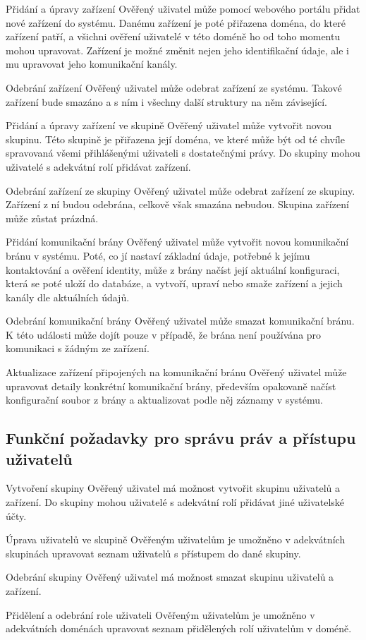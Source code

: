 \begin{enumfunctional}[style=nextline]
\item[Přidání a úpravy zařízení]
Ověřený uživatel může pomocí webového portálu přidat nové zařízení do systému. Danému zařízení je poté přiřazena doména, do které zařízení patří, a všichni ověření uživatelé v této doméně ho od toho momentu mohou upravovat. Zařízení je možné změnit nejen jeho identifikační údaje, ale i mu upravovat jeho komunikační kanály.
\item[Odebrání zařízení]
Ověřený uživatel může odebrat zařízení ze systému. Takové zařízení bude smazáno a s ním i všechny další struktury na něm závisející.
\item[Přidání a úpravy zařízení ve skupině]
Ověřený uživatel může vytvořit novou skupinu. Této skupině je přiřazena její doména, ve které může být od té chvíle spravovaná všemi přihlášenými uživateli s dostatečnými právy. Do skupiny mohou uživatelé s adekvátní rolí přidávat zařízení.
\item[Odebrání zařízení ze skupiny]
Ověřený uživatel může odebrat zařízení ze skupiny. Zařízení z ní budou odebrána, celkově však smazána nebudou. Skupina zařízení může zůstat prázdná.
\item[Přidání komunikační brány]
Ověřený uživatel může vytvořit novou komunikační bránu v systému. Poté, co jí nastaví základní údaje, potřebné k jejímu kontaktování a ověření identity, může z brány načíst její aktuální konfiguraci, která se poté uloží do databáze, a vytvoří, upraví nebo smaže zařízení a jejich kanály dle aktuálních údajů.
\item[Odebrání komunikační brány]
Ověřený uživatel může smazat komunikační bránu. K této události může dojít pouze v případě, že brána není používána pro komunikaci s žádným ze zařízení.
\item[Aktualizace zařízení připojených na komunikační bránu]
Ověřený uživatel může upravovat detaily konkrétní komunikační brány, především opakovaně načíst konfigurační soubor z brány a aktualizovat podle něj záznamy v systému.

\subsection{Funkční požadavky pro správu práv a přístupu uživatelů}

\item[Vytvoření skupiny]
Ověřený uživatel má možnost vytvořit skupinu uživatelů a zařízení. Do skupiny mohou uživatelé s adekvátní rolí přidávat jiné uživatelské účty.
\item[Úprava uživatelů ve skupině]
Ověřeným uživatelům je umožněno v adekvátních skupinách upravovat seznam uživatelů s přístupem do dané skupiny.
\item[Odebrání skupiny]
Ověřený uživatel má možnost smazat skupinu uživatelů a zařízení.
\item[Přidělení a odebrání role uživateli]
Ověřeným uživatelům je umožněno v adekvátních doménách upravovat seznam přidělených rolí uživatelům v doméně. 
\end{enumfunctional}

